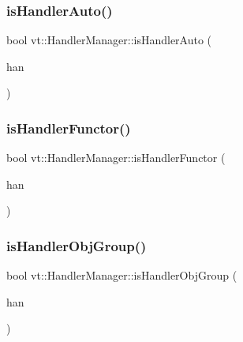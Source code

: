 \subsubsection{\texorpdfstring{is\+Handler\+Auto()}{isHandlerAuto()}}
{\footnotesize\ttfamily bool vt\+::\+Handler\+Manager\+::is\+Handler\+Auto (\begin{DoxyParamCaption}\item[{\hyperlink{namespacevt_af64846b57dfcaf104da3ef6967917573}{Handler\+Type}}]{han }\end{DoxyParamCaption})\hspace{0.3cm}{\ttfamily [static]}}

\mbox{\label{structvt_1_1_handler_manager_a0d03f576b15390773522317a4086e725}} 
\subsubsection{\texorpdfstring{is\+Handler\+Functor()}{isHandlerFunctor()}}
{\footnotesize\ttfamily bool vt\+::\+Handler\+Manager\+::is\+Handler\+Functor (\begin{DoxyParamCaption}\item[{\hyperlink{namespacevt_af64846b57dfcaf104da3ef6967917573}{Handler\+Type}}]{han }\end{DoxyParamCaption})\hspace{0.3cm}{\ttfamily [static]}}

\mbox{\label{structvt_1_1_handler_manager_a41bb9a71156fa3010988e8b576022bf5}} 
\subsubsection{\texorpdfstring{is\+Handler\+Obj\+Group()}{isHandlerObjGroup()}}
{\footnotesize\ttfamily bool vt\+::\+Handler\+Manager\+::is\+Handler\+Obj\+Group (\begin{DoxyParamCaption}\item[{\hyperlink{namespacevt_af64846b57dfcaf104da3ef6967917573}{Handler\+Type}}]{han }\end{DoxyParamCaption})\hspace{0.3cm}{\ttfamily [static]}}

